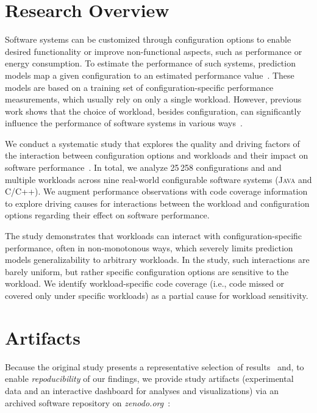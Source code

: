 \documentclass[10pt,conference]{IEEEtran}
\begin{document}
	\section{Research Overview}
	Software systems can be customized through configuration options to enable desired functionality or improve non-functional aspects, such as performance or energy consumption. To estimate the performance of such systems, prediction models map a given configuration to an estimated performance value~\cite{kaltenecker_interplay_2020}. These models are based on a training set of configuration-specific performance measurements, which usually rely on only a single workload. However, previous work shows that the choice of workload, besides configuration, can significantly influence the performance of software systems in various ways~\cite{alves_sampling_2020,lesoil_2021}.  
	
	We conduct a systematic study that explores the quality and driving factors of the interaction between configuration options and workloads and their impact on software performance~\cite{muhlbauer_workload_2023}. In total, we analyze 25\,258 configurations and and multiple workloads across nine real-world configurable software systems (\textsc{Java} and \textsc{C}/\textsc{C++}). We augment performance observations with code coverage information to explore driving causes for interactions between the workload and configuration options regarding their effect on software performance. 
	
	The study demonstrates that workloads can interact with configuration-specific performance, often in non-monotonous ways, which severely limits prediction models generalizability to arbitrary workloads. In the study, such interactions are barely uniform, but rather specific configuration options are sensitive to the workload. We identify workload-specific code coverage (i.e., code missed or covered only  under specific workloads) as a partial cause for workload sensitivity.
	
	\section{Artifacts}
	Because the original study presents a representative selection of results~\cite{muhlbauer_workload_2023} and, to enable \textit{repoducibility} of our findings, we provide study artifacts (experimental data and an interactive dashboard for analyses and visualizations) via an archived software repository on \textit{zenodo.org}~\cite{muhlbauer_workload_2023_companion}:
\end{document}
